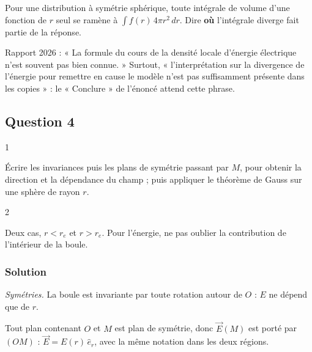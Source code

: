 \documentclass[11pt,a4paper]{article}
\begin{document}
\begin{methode}

Pour une distribution à symétrie sphérique, toute intégrale de volume d'une fonction de \(r\) seul se ramène à \(\int f(r)\,4\pi r^2\,dr\). Dire \textbf{où} l'intégrale diverge fait partie de la réponse.

\end{methode}

\begin{jury}

Rapport 2026 : « La formule du cours de la densité locale d'énergie électrique n'est souvent pas bien connue. » Surtout, « l'interprétation sur la divergence de l'énergie pour remettre en cause le modèle n'est pas suffisamment présente dans les copies » : le « Conclure » de l'énoncé attend cette phrase.

\end{jury}

\hypertarget{question-4}{%
\subsection{Question 4}\label{question-4}}

\begin{indication}{1}

Écrire les invariances puis les plans de symétrie passant par \(M\), pour obtenir la direction et la dépendance du champ ; puis appliquer le théorème de Gauss sur une sphère de rayon \(r\).

\end{indication}

\begin{indication}{2}

Deux cas, \(r<r_e\) et \(r>r_e\). Pour l'énergie, ne pas oublier la contribution de l'intérieur de la boule.

\end{indication}

\hypertarget{solution-3}{%
\subsubsection{Solution}\label{solution-3}}

\emph{Symétries.} La boule est invariante par toute rotation autour de \(O\) : \(E\) ne dépend que de \(r\).

Tout plan contenant \(O\) et \(M\) est plan de symétrie, donc \(\vec E(M)\) est porté par \((OM)\) : \(\vec E=E(r)\,\hat e_r\), avec la même notation dans les deux régions.
\end{document}
